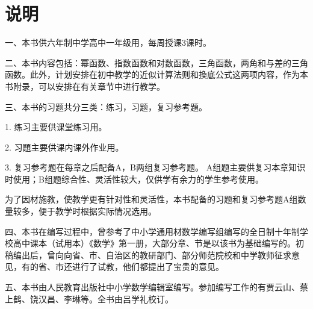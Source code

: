 
\chapter{说明}

一、本书供六年制中学高中一年级用，每周授课3课时。

二、本书内容包括：幂函数、指数函数和对数函数，三角函数，两角和与差的三角函数。此外，计划安排在初中教学的近似计算法则和換底公式这两项内容，作为本书附录，可以安排在有关章节中进行教学。

三、本书的习题共分三类：练习，习题，复习参考題。

1. 练习\quad 主要供课堂练习用。

2. 习題\quad 主要供课内课外作业用。

3. 复习参考题\quad 在每章之后配备A，B两组复习参考题。
A组题主要供复习本章知识时使用；B组题综合性、灵活性较大，仅供学有余力的学生参考使用。

为了因材施教，使教学更有针对性和灵活性，本书配备的习题和复习参考题A组数量较多，便于教学时根据实际情况选用。

四、本书在编写过程中，曾参考了中小学通用材数学编写组编写的全日制十年制学校高中课本（试用本）《数学》第一册，大部分章、节是以该书为基础编写的。初稿编出后，曾向向省、市、自治区的教研部门、部分师范院校和中学教师征求意见，有的省、市还进行了试教，他们都提出了宝贵的意见。

五、本书由人民教育出版社中小学数学编辑室编写。参加编写工作的有贾云山、蔡上鹤、饶汉昌、李琳等。全书由吕学礼校订。
